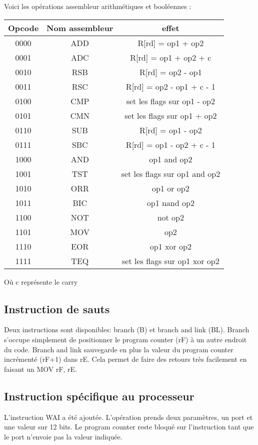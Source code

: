 \documentclass[a4paper]{article}
\begin{document}
Voici les opérations assembleur arithmétiques et booléennes :\\

\begin{tabular}{|c|c|c|}
  \hline
  Opcode & Nom assembleur & effet \\
  \hline
  0000 & ADD & R[rd] = op1 + op2\\
  0001 & ADC & R[rd] = op1 + op2 + c\\
  0010 & RSB & R[rd] = op2 - op1\\
  0011 & RSC & R[rd] = op2 - op1 + c - 1\\
  0100 & CMP & set les flags sur op1 - op2\\
  0101 & CMN & set les flags sur op1 + op2\\
  0110 & SUB & R[rd] = op1 - op2 \\
  0111 & SBC & R[rd] = op1 - op2 + c - 1\\
  1000 & AND & op1 and op2\\
  1001 & TST & set les flags sur op1 and op2\\
  1010 & ORR & op1 or op2\\
  1011 & BIC & op1 nand op2\\
  1100 & NOT & not op2\\
  1101 & MOV & op2\\
  1110 & EOR & op1 xor op2\\
  1111 & TEQ & set les flags sur op1 xor op2\\
  \hline
\end{tabular}

Où c représente le carry

\subsection{Instruction de sauts}
Deux instructions sont disponibles: branch (B) et branch and link (BL).
Branch s'occupe simplement de positionner le program counter (rF) à un autre
endroit du code. Branch and link sauvegarde en plus la valeur du program counter
incrémenté (rF+1) dans rE. Cela permet de faire des retours très facilement en
faisant un MOV rF, rE.

\subsection{Instruction spécifique au processeur}

L'instruction WAI a été ajoutée. L'opération prends deux paramètres, un port et
une valeur sur 12 bits. Le program counter reste bloqué sur l'instruction tant
que le port n'envoie pas la valeur indiquée.
\end{document}
